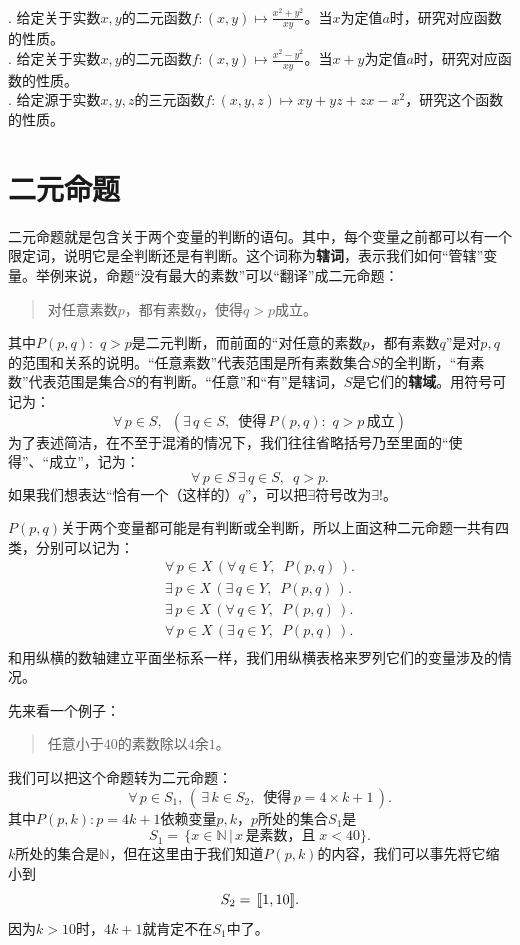 \documentclass[12pt,UTF8,fontset=none]{ctexbook}
\begin{document}
\begin{xt}
    \mbox{} \\
    . 给定关于实数$x, y$的二元函数$f: (x, y) \mapsto \frac{x^2 + y^2}{xy}$。当$x$为定值$a$时，研究对应函数的性质。\\
    . 给定关于实数$x, y$的二元函数$f: (x, y) \mapsto \frac{x^2 - y^2}{xy}$。当$x+y$为定值$a$时，研究对应函数的性质。\\
    . 给定源于实数$x,y,z$的三元函数$f:(x,y,z) \mapsto xy + yz + zx - x^2$，研究这个函数的性质。
\end{xt}

\section{二元命题}
二元命题就是包含关于两个变量的判断的语句。其中，每个变量之前都可以有一个限定词，说明它是全判断还是有判断。这个词称为\textbf{辖词}，表示我们如何“管辖”变量。举例来说，命题“没有最大的素数”可以“翻译”成二元命题：
\begin{quotation}
    对任意素数$p$，都有素数$q$，使得$q > p$成立。
\end{quotation}
其中$P(p,q): \,\,q > p$是二元判断，而前面的“对任意的素数$p$，都有素数$q$”是对$p,q$的范围和关系的说明。“任意素数”代表范围是所有素数集合$S$的全判断，“有素数”代表范围是集合$S$的有判断。“任意”和“有”是辖词，$S$是它们的\textbf{辖域}。用符号可记为：
$$ \forall \,p\in S, \,\,\,\left(\exists \,q\in S , \,\,\, \mbox{使得}\,P(p,q): \,\,q > p \,\mbox{成立}\right)$$
为了表述简洁，在不至于混淆的情况下，我们往往省略括号乃至里面的“使得”、“成立”，记为：
$$ \forall \, p\in S \, \exists \,q\in S, \,\,\, q > p. $$
如果我们想表达“恰有一个（这样的）$q$”，可以把$\exists$符号改为$\exists !$。

$P(p,q)$关于两个变量都可能是有判断或全判断，所以上面这种二元命题一共有四类，分别可以记为：
\begin{align*}
    \forall \, p\in X \,( \forall \,q\in Y, \,\,\, P(p,q)\,). \\
    \exists \, p\in X \,( \exists \,q\in Y, \,\,\, P(p,q)\,). \\
    \exists \, p\in X \,( \forall \,q\in Y, \,\,\, P(p,q)\,). \\
    \forall \, p\in X \,( \exists \,q\in Y, \,\,\, P(p,q)\,). \\
\end{align*}
和用纵横的数轴建立平面坐标系一样，我们用纵横表格来罗列它们的变量涉及的情况。

先来看一个例子：
\begin{quotation}
    任意小于$40$的素数除以$4$余$1$。
\end{quotation}
我们可以把这个命题转为二元命题：
$$ \forall \, p \in  S_1, \, (\,\exists \, k \in S_2, \,\,\, \mbox{使得}\, p = 4\times k + 1\,).$$
其中$P(p,k) : p = 4k+1$依赖变量$p,k$，$p$所处的集合$S_1$是
$$ S_1 = \,\{x\in\mathbb{N}\,|\, x\,\mbox{是素数，且}\;x<40\}.$$
$k$所处的集合是$\mathbb{N}$，但在这里由于我们知道$P(p,k)$的内容，我们可以事先将它缩小到
$$ S_2 =\,[\![1,10]\!].$$
因为$k>10$时，$4k+1$就肯定不在$S_1$中了。
\end{document}
